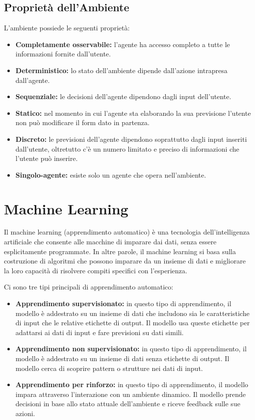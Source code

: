 \documentclass{article}
\begin{document}
\subsection{Proprietà dell'Ambiente}
L'ambiente possiede le seguenti proprietà:
\begin{itemize}
    \item \textbf{Completamente osservabile:} l'agente ha accesso completo a tutte le informazioni fornite dall'utente.
    \item \textbf{Deterministico:} lo stato dell'ambiente dipende dall'azione intrapresa dall'agente.
    \item \textbf{Sequenziale:} le decisioni dell'agente dipendono dagli input dell'utente.
    \item \textbf{Statico:} nel momento in cui l'agente sta elaborando la sua previsione l'utente non può modificare il form dato in partenza.
    \item \textbf{Discreto:} le previsioni dell'agente dipendono soprattutto dagli input inseriti dall'utente, oltretutto c'è un numero limitato e preciso di informazioni che l'utente può inserire.
    \item \textbf{Singolo-agente:} esiste solo un agente che opera nell'ambiente.
\end{itemize}

\newpage

\section{Machine Learning}
Il machine learning (apprendimento automatico) è una tecnologia dell'intelligenza artificiale che consente alle macchine di imparare dai dati, senza essere esplicitamente programmate. In altre parole, il machine learning si basa sulla costruzione di algoritmi che possono imparare da un insieme di dati e migliorare la loro capacità di risolvere compiti specifici con l'esperienza.

Ci sono tre tipi principali di apprendimento automatico:
\begin{itemize}
    \item \textbf{Apprendimento supervisionato:} in questo tipo di apprendimento, il modello è addestrato su un insieme di dati che includono sia le caratteristiche di input che le relative etichette di output. Il modello usa queste etichette per adattarsi ai dati di input e fare previsioni su dati simili.
    \item \textbf{Apprendimento non supervisionato:} in questo tipo di apprendimento, il modello è addestrato su un insieme di dati senza etichette di output. Il modello cerca di scoprire pattern o strutture nei dati di input.
    \item \textbf{Apprendimento per rinforzo:} in questo tipo di apprendimento, il modello impara attraverso l'interazione con un ambiente dinamico. Il modello prende decisioni in base allo stato attuale dell'ambiente e riceve feedback sulle sue azioni.
\end{itemize}
\end{document}
